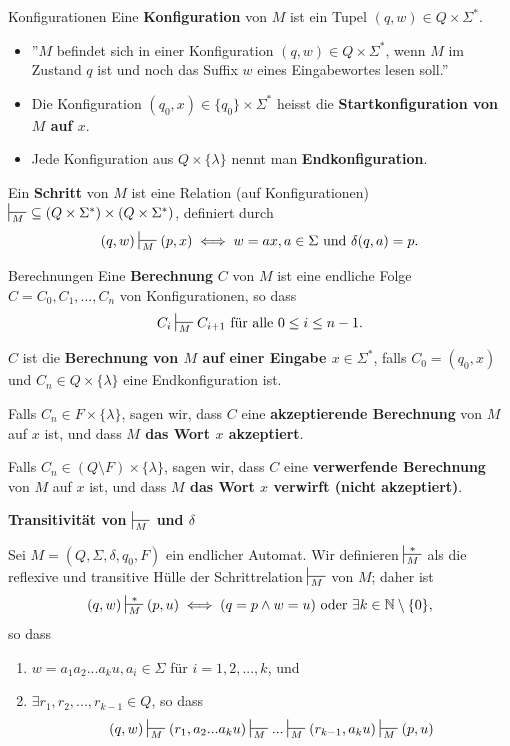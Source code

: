 \documentclass[a4paper, 11pt]{article}
\def\N{\mathbb{N}}
\newcommand\myTitle[1]{{\large \textbf {#1}}}
\begin{document}
	
	\begin{mainbox}{Konfigurationen}
		Eine \textbf{Konfiguration} von $M$ ist ein Tupel $(q, w) \in Q \times \Sigma^*$. 
	\end{mainbox}
	\begin{itemize}[label=-]
		\item ''$M$ befindet sich in einer Konfiguration $(q,w) \in Q \times \Sigma^*$, wenn $M$ im Zustand $q$ ist und noch das Suffix $w$ eines Eingabewortes lesen soll.''
		\item Die Konfiguration $(q_0, x) \in \{q_0\} \times \Sigma^*$ heisst die \textbf{Startkonfiguration von $M$ auf $x$}.
		\item Jede Konfiguration aus $Q \times \{\lambda\}$ nennt man \textbf{Endkonfiguration}.
	\end{itemize}
	\begin{mainbox}{}
		Ein \textbf{Schritt} von $M$ ist eine Relation (auf Konfigurationen) $\sststile{M}{} \ \subseteq (Q \times \Sigma^*)\times(Q\times \Sigma^*)$, definiert durch
		$$(q, w) \sststile{M}{}(p, x) \iff w = ax, a \in \Sigma \text{ und }\delta(q, a) = p.$$
	\end{mainbox}

	\begin{mainbox}{Berechnungen}
		Eine \textbf{Berechnung} $C$ von $M$ ist eine endliche Folge $C = C_0, C_1, ..., C_n$ von Konfigurationen, so dass 
		$$C_i \sststile{M}{} C_{i+1} \text{ für alle } 0 \leq i \leq n-1.$$

		$C$ ist die \textbf{Berechnung von $M$ auf einer Eingabe $x \in \Sigma^*$}, falls $C_0 = (q_0, x)$ und $C_n \in Q \times \{\lambda\}$ eine Endkonfiguration ist.
	\end{mainbox}
	Falls $C_n \in F \times \{\lambda\}$, sagen wir, dass $C$ eine \textbf{akzeptierende Berechnung} von $M$ auf $x$ ist, und dass \textbf{$M$ das Wort $x$ akzeptiert}.

	Falls $C_n \in (Q \setminus F) \times \{\lambda\}$, sagen wir, dass $C$ eine \textbf{verwerfende Berechnung} von $M$ auf $x$ ist, und dass \textbf{$M$ das Wort $x$ verwirft (nicht akzeptiert)}.



	\myTitle{Transitivität von $\sststile{M}{}$ und $\delta$}
	\begin{mainbox}{}
		Sei $M = (Q, \Sigma, \delta, q_0, F)$ ein endlicher Automat. Wir definieren $\sststile{M}{*}$ als die reflexive und transitive Hülle der Schrittrelation $\sststile{M}{}$ von $M$; daher ist
		$$(q, w) \sststile{M}{*}(p,u) \iff (q = p \land w = u) \text{ oder } \exists k \in \N\setminus\{0\},$$
		so dass 
		\begin{enumerate}[label=(\roman*)]
			\item $w = a_1a_2...a_ku, a_i \in \Sigma$ für $i = 1,2,...,k$, und
			\item $\exists r_1, r_2, ...,r_{k-1}\in Q$, so dass 
			$$(q,w) \sststile{M}{}(r_1, a_2...a_ku) \sststile{M}{}...\sststile{M}{}(r_{k-1},a_ku)\sststile{M}{}(p, u)$$
		\end{enumerate}
	\end{mainbox}
	
\end{document}
